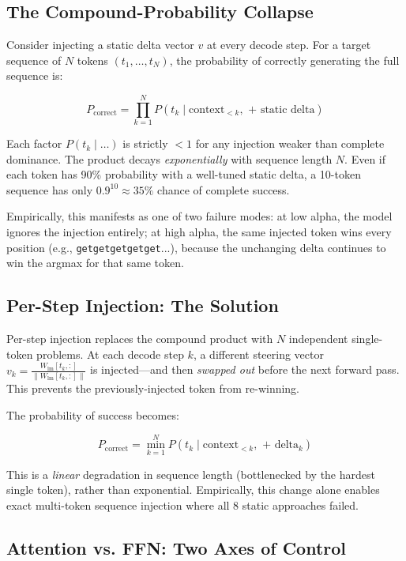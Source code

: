\documentclass[11pt,a4paper]{article}
\begin{document}
\subsection{The Compound-Probability Collapse}

Consider injecting a static delta vector $v$ at every decode step. For a target sequence of $N$ tokens $(t_1, \ldots, t_N)$, the probability of correctly generating the full sequence is:

\[
P_{\text{correct}} = \prod_{k=1}^{N} P(t_k \mid \text{context}_{<k}, \text{ + static delta})
\]

Each factor $P(t_k \mid \ldots)$ is strictly $< 1$ for any injection weaker than complete dominance. The product decays \emph{exponentially} with sequence length $N$. Even if each token has 90\% probability with a well-tuned static delta, a 10-token sequence has only $0.9^{10} \approx 35\%$ chance of complete success.

Empirically, this manifests as one of two failure modes: at low alpha, the model ignores the injection entirely; at high alpha, the same injected token wins every position (e.g., \texttt{getgetgetgetget}...), because the unchanging delta continues to win the argmax for that same token.

\subsection{Per-Step Injection: The Solution}

Per-step injection replaces the compound product with $N$ independent single-token problems. At each decode step $k$, a different steering vector $v_k = \frac{W_{\text{lm}}[t_k,:]}{\|W_{\text{lm}}[t_k,:]\|}$ is injected---and then \emph{swapped out} before the next forward pass. This prevents the previously-injected token from re-winning.

The probability of success becomes:

\[
P_{\text{correct}} = \min_{k=1}^{N} P(t_k \mid \text{context}_{<k}, \text{ + delta}_k)
\]

This is a \emph{linear} degradation in sequence length (bottlenecked by the hardest single token), rather than exponential. Empirically, this change alone enables exact multi-token sequence injection where all 8 static approaches failed.

\subsection{Attention vs. FFN: Two Axes of Control}
\end{document}
